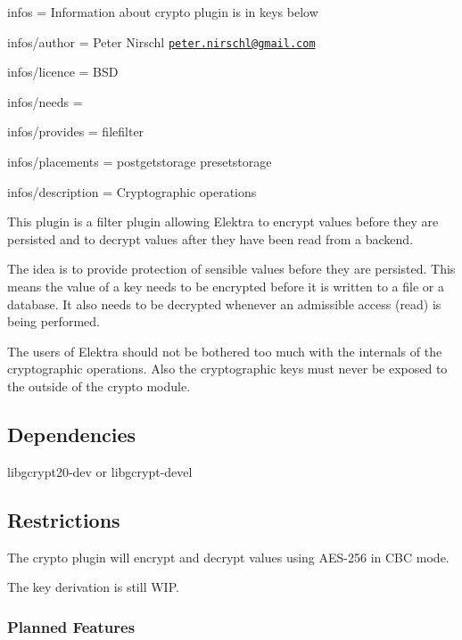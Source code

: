 
\begin{DoxyItemize}
\item infos = Information about crypto plugin is in keys below
\item infos/author = Peter Nirschl \href{mailto:peter.nirschl@gmail.com}{\tt peter.\+nirschl@gmail.\+com}
\item infos/licence = B\+S\+D
\item infos/needs =
\item infos/provides = filefilter
\item infos/placements = postgetstorage presetstorage
\item infos/description = Cryptographic operations
\end{DoxyItemize}

This plugin is a filter plugin allowing Elektra to encrypt values before they are persisted and to decrypt values after they have been read from a backend.

The idea is to provide protection of sensible values before they are persisted. This means the value of a key needs to be encrypted before it is written to a file or a database. It also needs to be decrypted whenever an admissible access (read) is being performed.

The users of Elektra should not be bothered too much with the internals of the cryptographic operations. Also the cryptographic keys must never be exposed to the outside of the crypto module.

\subsection*{Dependencies}


\begin{DoxyItemize}
\item {\ttfamily libgcrypt20-\/dev} or {\ttfamily libgcrypt-\/devel}
\end{DoxyItemize}

\subsection*{Restrictions}

The crypto plugin will encrypt and decrypt values using A\+E\+S-\/256 in C\+B\+C mode.

The key derivation is still W\+I\+P.

\subsubsection*{Planned Features}


